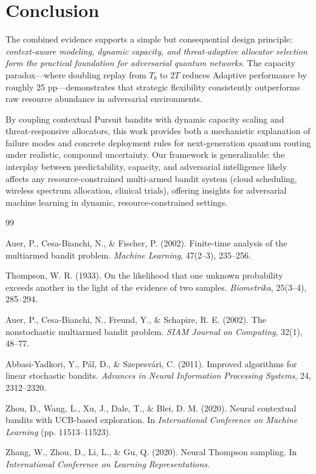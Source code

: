 \documentclass[11pt,a4paper]{article}
\begin{document}
\section{Conclusion}
\label{sec:conclusion}

The combined evidence supports a simple but consequential design principle: \emph{context-aware modeling, dynamic capacity, and threat-adaptive allocator selection form the practical foundation for adversarial quantum networks}. The capacity paradox—where doubling replay from $T_b$ to $2T$ reduces Adaptive performance by roughly 25 pp—demonstrates that strategic flexibility consistently outperforms raw resource abundance in adversarial environments.

By coupling contextual Pursuit bandits with dynamic capacity scaling and threat-responsive allocators, this work provides both a mechanistic explanation of failure modes and concrete deployment rules for next-generation quantum routing under realistic, compound uncertainty. Our framework is generalizable: the interplay between predictability, capacity, and adversarial intelligence likely affects any resource-constrained multi-armed bandit system (cloud scheduling, wireless spectrum allocation, clinical trials), offering insights for adversarial machine learning in dynamic, resource-constrained settings.

\clearpage


\begin{thebibliography}{99}

 Auer, P., Cesa-Bianchi, N., \& Fischer, P. (2002). Finite-time analysis of the multiarmed bandit problem. \textit{Machine Learning}, 47(2--3), 235--256.

 Thompson, W. R. (1933). On the likelihood that one unknown probability exceeds another in the light of the evidence of two samples. \textit{Biometrika}, 25(3--4), 285--294.

 Auer, P., Cesa-Bianchi, N., Freund, Y., \& Schapire, R. E. (2002). The nonstochastic multiarmed bandit problem. \textit{SIAM Journal on Computing}, 32(1), 48--77.

 Abbasi-Yadkori, Y., Pál, D., \& Szepesvári, C. (2011). Improved algorithms for linear stochastic bandits. \textit{Advances in Neural Information Processing Systems}, 24, 2312--2320.

 Zhou, D., Wang, L., Xu, J., Dale, T., \& Blei, D. M. (2020). Neural contextual bandits with UCB-based exploration. In \textit{International Conference on Machine Learning} (pp. 11513--11523).

 Zhang, W., Zhou, D., Li, L., \& Gu, Q. (2020). Neural Thompson sampling. In \textit{International Conference on Learning Representations}.

\end{thebibliography}
\end{document}

